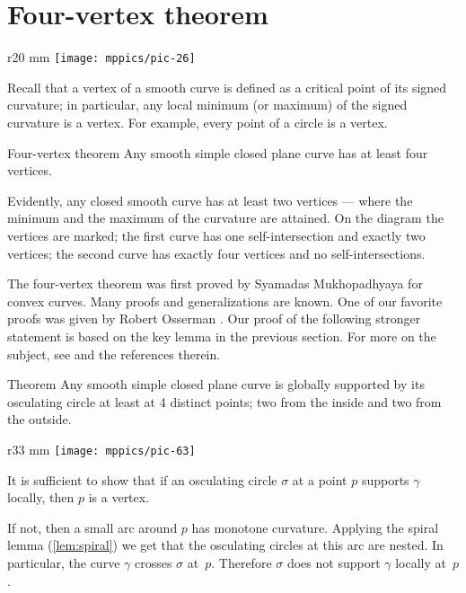 \section{Four-vertex theorem}
{

\begin{wrapfigure}{r}{20 mm}
\vskip-8mm
\centering
\texttt{[image: mppics/pic-26]}
\vskip0mm
\end{wrapfigure}

Recall that a vertex of a smooth curve is defined as a critical point of its signed curvature;
in particular, any local minimum (or maximum) of the signed curvature is a vertex.
For example, every point of a circle is a vertex.

\begin{thm}{Four-vertex theorem}\label{thm:4-vert}
Any smooth simple closed plane curve has at least four vertices.
\end{thm}

}

Evidently, any closed smooth curve has at least two vertices --- where the minimum and the maximum of the curvature are attained.
On the diagram the vertices are marked;
the first curve has one self-intersection and exactly two vertices;
the second curve has exactly four vertices and no self-intersections.

The four-vertex theorem was first proved by Syamadas Mukhopadhyaya \cite{mukhopadhyaya} for convex curves.
Many proofs and generalizations are known.
One of our favorite proofs was given by Robert Osserman \cite{osserman}.
Our proof of the following stronger statement is based on the key lemma in the previous section.
For more on the subject, see \cite{petrunin-zamora:moon} and the references therein.

\begin{thm}{Theorem}\label{thm:4-vert-supporting}
Any smooth simple closed plane curve is globally supported by its osculating circle at least at 4 distinct points;
two from the inside and two from the outside.
\end{thm}

{

\begin{wrapfigure}[8]{r}{33 mm}
\vskip-0mm
\centering
\texttt{[image: mppics/pic-63]}
\vskip0mm
\end{wrapfigure}

It is sufficient to show that if an osculating circle $\sigma$ at a point $p$ supports $\gamma$ locally, then $p$ is a vertex.

If not, then a small arc around $p$ has monotone curvature.
Applying the spiral lemma (\ref{lem:spiral}) we get that the osculating circles at this arc are nested.
In particular, the curve $\gamma$ crosses $\sigma$ at~$p$. 
Therefore $\sigma$ does not support $\gamma$ locally at~$p$.
\qeds


}


